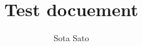 \documentclass[a4paper]{article}
\begin{document}
\title{Test docuement}
\author{Sota Sato}

\maketitle



\end{document}
